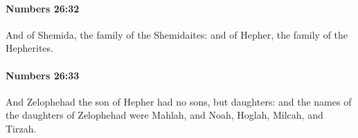 		\paragraph{Numbers 26:32} %
			\label{NUMBERS-26-32}

			And of Shemida, the family of the Shemidaites: and of Hepher, the family of the Hepherites.


		\paragraph{Numbers 26:33} %
			\label{NUMBERS-26-33}

			And Zelophehad the son of Hepher had no sons, but daughters: and the names of the daughters of Zelophehad were Mahlah, and Noah, Hoglah, Milcah, and Tirzah.



